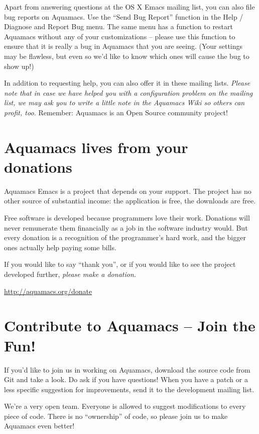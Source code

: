 \documentclass[11pt,letterpaper]{article}
\begin{document}
Apart from answering questions at the OS X Emacs mailing list, you can also file bug reports on Aquamacs. Use the ``Send Bug Report'' function in the Help / Diagnose and Report Bug menu.  The same menu has a function to restart Aquamacs without any of your customizations -- please use this function to ensure that it is really a bug in Aquamacs that you are seeing.  (Your settings may be flawless, but even so we'd like to know which ones will cause the bug to show up!)

In addition to requesting help, you can also offer it in these mailing lists. \emph{Please note that in case we have helped you with a configuration problem on the mailing list, we may ask you to write a little note in the Aquamacs Wiki so others can profit, too.} Remember: Aquamacs is an Open Source community project!

\section{Aquamacs lives from your donations}

Aquamacs Emacs is a project that depends on your support. The project
has no other source of substantial income: the application is free,
the downloads are free. 

Free software is developed because programmers love their work. Donations will never remunerate them financially as a job in the software industry would. But every donation is a recognition of the programmer's hard work, and the bigger ones actually help paying some bills.

If you would like to say ``thank you'', or if you would like to see
the project developed further, \emph{please make a donation.}

\url{http://aquamacs.org/donate}


\section {Contribute to Aquamacs -- Join the Fun!}

If you'd like to join us in working on Aquamacs, download the source
code from Git and take a look. Do ask if you have questions! When you
have a patch or a less specific suggestion for improvements, send it
to the development mailing list.

We're a very open team. Everyone is allowed to suggest modifications
to every piece of code. There is no ``ownership'' of code, so please
join us to make Aquamacs even better!
\end{document}
